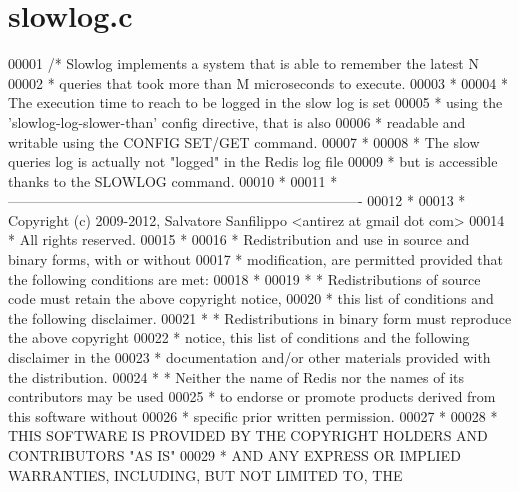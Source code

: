 \hypertarget{slowlog_8c_source}{}\section{slowlog.\+c}
\label{slowlog_8c_source}

\begin{DoxyCode}
00001 \textcolor{comment}{/* Slowlog implements a system that is able to remember the latest N}
00002 \textcolor{comment}{ * queries that took more than M microseconds to execute.}
00003 \textcolor{comment}{ *}
00004 \textcolor{comment}{ * The execution time to reach to be logged in the slow log is set}
00005 \textcolor{comment}{ * using the 'slowlog-log-slower-than' config directive, that is also}
00006 \textcolor{comment}{ * readable and writable using the CONFIG SET/GET command.}
00007 \textcolor{comment}{ *}
00008 \textcolor{comment}{ * The slow queries log is actually not "logged" in the Redis log file}
00009 \textcolor{comment}{ * but is accessible thanks to the SLOWLOG command.}
00010 \textcolor{comment}{ *}
00011 \textcolor{comment}{ * ----------------------------------------------------------------------------}
00012 \textcolor{comment}{ *}
00013 \textcolor{comment}{ * Copyright (c) 2009-2012, Salvatore Sanfilippo <antirez at gmail dot com>}
00014 \textcolor{comment}{ * All rights reserved.}
00015 \textcolor{comment}{ *}
00016 \textcolor{comment}{ * Redistribution and use in source and binary forms, with or without}
00017 \textcolor{comment}{ * modification, are permitted provided that the following conditions are met:}
00018 \textcolor{comment}{ *}
00019 \textcolor{comment}{ *   * Redistributions of source code must retain the above copyright notice,}
00020 \textcolor{comment}{ *     this list of conditions and the following disclaimer.}
00021 \textcolor{comment}{ *   * Redistributions in binary form must reproduce the above copyright}
00022 \textcolor{comment}{ *     notice, this list of conditions and the following disclaimer in the}
00023 \textcolor{comment}{ *     documentation and/or other materials provided with the distribution.}
00024 \textcolor{comment}{ *   * Neither the name of Redis nor the names of its contributors may be used}
00025 \textcolor{comment}{ *     to endorse or promote products derived from this software without}
00026 \textcolor{comment}{ *     specific prior written permission.}
00027 \textcolor{comment}{ *}
00028 \textcolor{comment}{ * THIS SOFTWARE IS PROVIDED BY THE COPYRIGHT HOLDERS AND CONTRIBUTORS "AS IS"}
00029 \textcolor{comment}{ * AND ANY EXPRESS OR IMPLIED WARRANTIES, INCLUDING, BUT NOT LIMITED TO, THE}

\end{DoxyCode}
